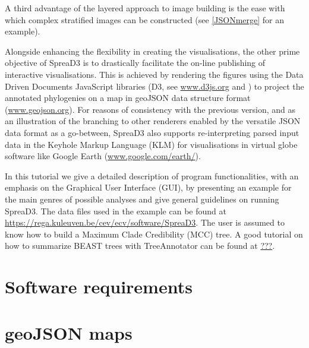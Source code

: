 \documentclass[english]{paper}
\begin{document}
A third advantage of the layered approach to image building is the ease with which complex stratified images can be constructed (see \ref{JSONmerge} for an example). 
\par
Alongside enhancing the flexibility in creating the visualisations, the other prime objective of SpreaD3 is to drastically facilitate the on-line publishing of interactive visualisations.
This is achieved by rendering the figures using the Data Driven Documents JavaScript libraries (D3, see \url{www.d3js.org} and \citet{Bostock:2011aa}) to project the annotated phylogenies on a map in geoJSON data structure format (\url{www.geojson.org}).
For reasons of consistency with the previous version, and as an illustration of the branching to other renderers enabled by the versatile JSON data format as a go-between, SpreaD3 also supports re-interpreting parsed input data in the Keyhole Markup Language (KLM) for visualisations in virtual globe software like Google Earth (\url{www.google.com/earth/}). 
\par
In this tutorial we give a detailed description of program functionalities, with an emphasis on the Graphical User Interface (GUI), by presenting an example for the main genres of possible analyses and give general guidelines on running SpreaD3. 
The data files used in the example can be found at  \url{https://rega.kuleuven.be/cev/ecv/software/SpreaD3}.
The user is assumed to know how to build a Maximum Clade Credibility (MCC) tree. 
A good tutorial on how to summarize BEAST trees with TreeAnnotator can be found at \url{???}.

\section{Software requirements}

\section{geoJSON maps}
\end{document}
